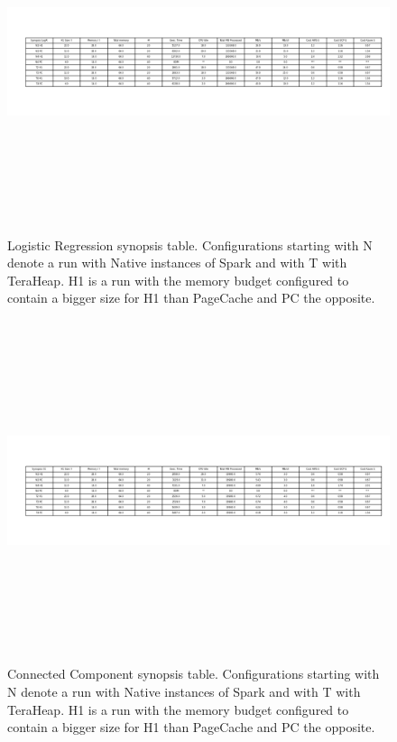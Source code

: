 \documentclass[twocolumn,10pt]{asme2e}
\begin{document}
\begin{figure}[ht]
        \includegraphics[width=20cm,height=10cm]{logr_table.png}
	\caption{Logistic Regression synopsis table. Configurations starting with N denote a run with Native instances of Spark and with T with TeraHeap. H1 is a run with the memory budget configured to contain a bigger size for H1 than PageCache and PC the opposite.}
	\label{fig:logr_table}
\end{figure}

\begin{figure}[ht]
        \includegraphics[width=20cm,height=10cm]{cc_table.png}
	\caption{Connected Component synopsis table. Configurations starting with N denote a run with Native instances of Spark and with T with TeraHeap. H1 is a run with the memory budget configured to contain a bigger size for H1 than PageCache and PC the opposite. }
	\label{fig:cc_table}
\end{figure}
\end{document}
